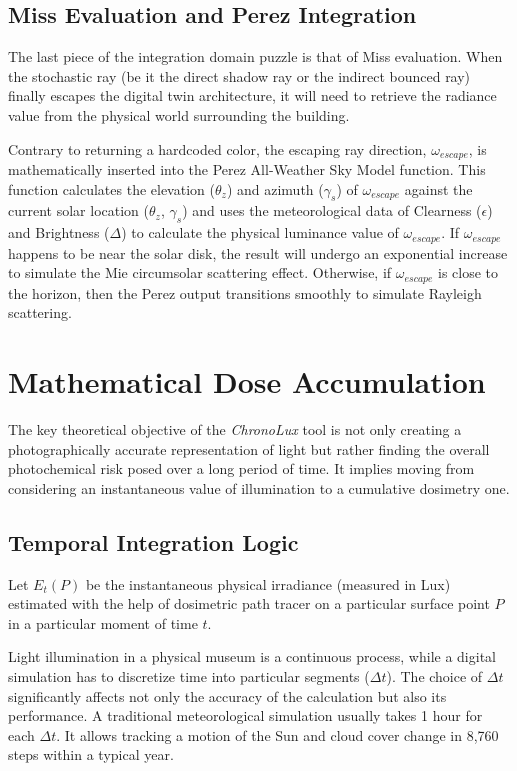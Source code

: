 \subsection{Miss Evaluation and Perez Integration}
The last piece of the integration domain puzzle is that of Miss evaluation. When the stochastic ray (be it the direct shadow ray or the indirect bounced ray) finally escapes the digital twin architecture, it will need to retrieve the radiance value from the physical world surrounding the building.

Contrary to returning a hardcoded color, the escaping ray direction, $\omega_{escape}$, is mathematically inserted into the Perez All-Weather Sky Model function. This function calculates the elevation ($\theta_z$) and azimuth ($\gamma_s$) of $\omega_{escape}$ against the current solar location ($\theta_z$, $\gamma_s$) and uses the meteorological data of Clearness ($\epsilon$) and Brightness ($\Delta$) to calculate the physical luminance value of $\omega_{escape}$. If $\omega_{escape}$ happens to be near the solar disk, the result will undergo an exponential increase to simulate the Mie circumsolar scattering effect. Otherwise, if $\omega_{escape}$ is close to the horizon, then the Perez output transitions smoothly to simulate Rayleigh scattering.

\section{Mathematical Dose Accumulation}\label{sec:dose_accumulation}
The key theoretical objective of the \textit{ChronoLux} tool is not only creating a photographically accurate representation of light but rather finding the overall photochemical risk posed over a long period of time. It implies moving from considering an instantaneous value of illumination to a cumulative dosimetry one.

\subsection{Temporal Integration Logic}
Let $E_t(P)$ be the instantaneous physical irradiance (measured in Lux) estimated with the help of dosimetric path tracer on a particular surface point $P$ in a particular moment of time $t$.

Light illumination in a physical museum is a continuous process, while a digital simulation has to discretize time into particular segments ($\Delta t$). The choice of $\Delta t$ significantly affects not only the accuracy of the calculation but also its performance. A traditional meteorological simulation usually takes 1 hour for each $\Delta t$. It allows tracking a motion of the Sun and cloud cover change in 8,760 steps within a typical year.

